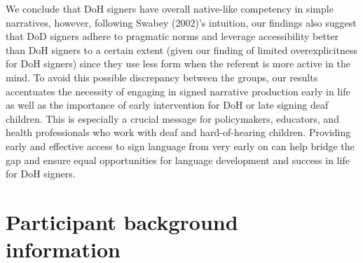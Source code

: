 \documentclass[]{elsarticle} %
\begin{document}
We conclude that DoH signers have overall native-like competency in
simple narratives, however, following Swabey (2002)'s intuition, our
findings also suggest that DoD signers adhere to pragmatic norms and
leverage accessibility better than DoH signers to a certain extent
(given our finding of limited overexplicitness for DoH signers) since
they use less form when the referent is more active in the mind. To
avoid this possible discrepancy between the groups, our results
accentuates the necessity of engaging in signed narrative production
early in life as well as the importance of early intervention for DoH or
late signing deaf children. This is especially a crucial message for
policymakers, educators, and health professionals who work with deaf and
hard-of-hearing children. Providing early and effective access to sign
language from very early on can help bridge the gap and ensure equal
opportunities for language development and success in life for DoH
signers.

\clearpage

\appendix

\hypertarget{participant-background-information}{%
\section{Participant background
information}\label{participant-background-information}}

\label{section:a}
\end{document}
